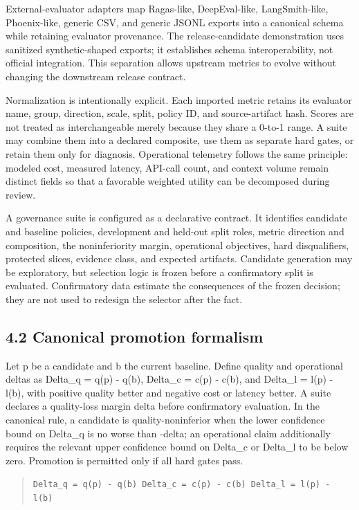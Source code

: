 \documentclass[11pt]{article}
\begin{document}
External-evaluator adapters map Ragas-like, DeepEval-like, LangSmith-like, Phoenix-like, generic CSV, and generic JSONL exports into a canonical schema while retaining evaluator provenance. The release-candidate demonstration uses sanitized synthetic-shaped exports; it establishes schema interoperability, not official integration. This separation allows upstream metrics to evolve without changing the downstream release contract.

Normalization is intentionally explicit. Each imported metric retains its evaluator name, group, direction, scale, split, policy ID, and source-artifact hash. Scores are not treated as interchangeable merely because they share a 0-to-1 range. A suite may combine them into a declared composite, use them as separate hard gates, or retain them only for diagnosis. Operational telemetry follows the same principle: modeled cost, measured latency, API-call count, and context volume remain distinct fields so that a favorable weighted utility can be decomposed during review.

A governance suite is configured as a declarative contract. It identifies candidate and baseline policies, development and held-out split roles, metric direction and composition, the noninferiority margin, operational objectives, hard disqualifiers, protected slices, evidence class, and expected artifacts. Candidate generation may be exploratory, but selection logic is frozen before a confirmatory split is evaluated. Confirmatory data estimate the consequences of the frozen decision; they are not used to redesign the selector after the fact.

\subsection{4.2 Canonical promotion formalism}
Let p be a candidate and b the current baseline. Define quality and operational deltas as Delta\_q = q(p) - q(b), Delta\_c = c(p) - c(b), and Delta\_l = l(p) - l(b), with positive quality better and negative cost or latency better. A suite declares a quality-loss margin delta before confirmatory evaluation. In the canonical rule, a candidate is quality-noninferior when the lower confidence bound on Delta\_q is no worse than -delta; an operational claim additionally requires the relevant upper confidence bound on Delta\_c or Delta\_l to be below zero. Promotion is permitted only if all hard gates pass.

\begin{quote}\small\texttt{Delta\_q = q(p) - q(b)      Delta\_c = c(p) - c(b)      Delta\_l = l(p) - l(b)}\end{quote}
\end{document}
